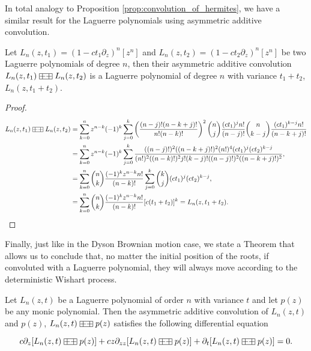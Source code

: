    In total analogy to Proposition \ref{prop:convolution_of_hermites}, we have a similar result for the Laguerre polynomials using asymmetric additive convolution.

\begin{proposition}
    Let $L_n(z,t_1) = (1-ct_1\partial_z)^n[z^n]$ and $L_n(z,t_2) = (1-ct_2\partial_z)^n[z^n]$ be two Laguerre polynomials of degree $n$, then their asymmetric additive convolution $L_n(z,t_1) \aac L_n(z,t_2)$ is a Laguerre polynomial of degree $n$ with variance $t_1+t_2$, $L_n(z,t_1+t_2)$. 
\end{proposition}

\begin{proof}
    \begin{align*}
        L_n(z,t_1) \aac L_n(z,t_2) &= \sum_{k=0}^n z^{n-k}(-1)^k \sum_{j=0}^k \left(\frac{(n-j)!(n-k+j)!}{n!(n-k)!}\right)^2\binom{n}{j}\frac{(ct_1)^jn!}{(n-j)!}\binom{n}{k-j}\frac{(ct_1)^{k-j} n!}{(n-k+j)!}\\ 
        &= \sum_{k=0}^n z^{n-k}(-1)^k \sum_{j=0}^k \frac{((n-j)!)^2((n-k+j)!)^2(n!)^4(ct_1)^j(ct_2)^{k-j}}{(n!)^2((n-k)!)^2j!(k-j)!((n-j)!)^2((n-k+j)!)^2},\\ 
        &= \sum_{k=0}^n \binom{n}{k} \frac{(-1)^k z^{n-k}n!}{(n-k)!}\sum_{j=0}^k \binom{k}{j}(ct_1)^j(ct_2)^{k-j}, \\  
        &=  \sum_{k=0}^n \binom{n}{k} \frac{(-1)^k z^{n-k}n!}{(n-k)!}[c(t_1 + t_2)]^k = L_n(z,t_1 + t_2).
    \end{align*}
\end{proof}

Finally, just like in the Dyson Brownian motion case, we state a Theorem that allows us to conclude that, no matter the initial position of the roots, if convoluted with a Laguerre polynomial, they will always move according to the deterministic Wishart process.

\begin{theorem}
    Let $L_n(z,t)$ be a Laguerre polynomial of order $n$ with variance $t$ and let $p(z)$ be any monic polynomial. Then the asymmetric additive convolution of $L_n(z,t)$ and $p(z)$, $L_n(z,t) \aac p(z)$ satisfies the following differential equation

    \begin{equation*}
        c\partial_z [L_n(z,t) \aac p(z)] + cz \partial_{zz}[L_n(z,t) \aac p(z)] + \partial_t [L_n(z,t) \aac p(z)] = 0.
    \end{equation*}
\end{theorem}

